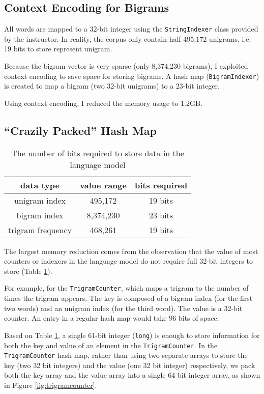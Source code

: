 \documentclass[12pt]{article}   %
\begin{document}
\subsection{Context Encoding for Bigrams}
All words are mapped to a 32-bit integer using the \texttt{StringIndexer} class provided by the instructor. In reality, the corpus only contain half 495,172 unigrams, i.e. 19 bits to store represent unigram.

Because the bigram vector is very sparse (only 8,374,230 bigrams), I exploited context encoding to save space for storing bigrams. A hash map (\texttt{BigramIndexer}) is created to map a bigram (two 32-bit unigrams) to a 23-bit integer.

Using context encoding, I reduced the memory usage to 1.2GB.


\subsection{“Crazily Packed” Hash Map}
\label{sec:crazyhashmap}

\begin{table}
\label{tbl:datasize}
\centering
\begin{tabular}{ c | c | c  }
	data type & value range & bits required \\
	\hline
	unigram index & 495,172 & 19 bits \\
	bigram index & 8,374,230 & 23 bits \\
	trigram frequency & 468,261 & 19 bits
\end{tabular}
\caption{The number of bits required to store data in the language model}
\end{table}

The largest memory reduction comes from the observation that the value of most counters or indexers in the language model do not require full 32-bit integers to store (Table \ref{tbl:datasize}).

For example, for the \texttt{TrigramCounter}, which maps a trigram to the number of times the trigram appears. The key is composed of a bigram index (for the first two words) and an unigram index (for the third word). The value is a 32-bit counter. An entry in a regular hash map would take 96 bits of space.

Based on Table \ref{tbl:datasize}, a single 61-bit integer (\texttt{long}) is enough to store information for both the key and value of an element in the \texttt{TrigramCounter}. In the \texttt{TrigramCounter} hash map, rather than using two separate arrays to store the key (two 32 bit integers) and the value (one 32 bit integer) respectively, we pack both the key array and the value array into a single 64 bit integer array, as shown in Figure \ref{fig:trigramcounter}.
\end{document}
